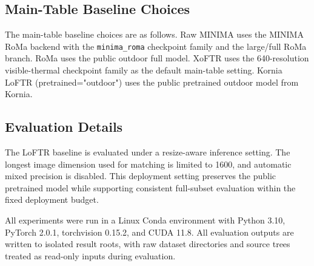 \subsection{Main-Table Baseline Choices}

The main-table baseline choices are as follows. Raw MINIMA uses the MINIMA RoMa backend
with the \texttt{minima\_roma} checkpoint family and the large/full RoMa branch. RoMa uses the
public outdoor full model. XoFTR uses the 640-resolution visible-thermal checkpoint family as the
default main-table setting. Kornia LoFTR (pretrained="outdoor") uses the public pretrained outdoor
model from Kornia.

\subsection{Evaluation Details}

The LoFTR baseline is evaluated under a resize-aware inference setting. The longest image
dimension used for matching is limited to 1600, and automatic mixed precision is disabled. This
deployment setting preserves the public pretrained model while supporting consistent full-subset
evaluation within the fixed deployment budget.

All experiments were run in a Linux Conda environment with Python 3.10,
PyTorch 2.0.1, torchvision 0.15.2, and CUDA 11.8. All evaluation outputs are written to isolated
result roots, with raw dataset directories and source trees treated as read-only inputs during
evaluation.

